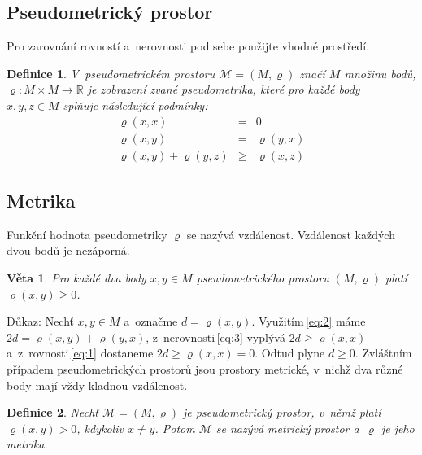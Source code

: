 \documentclass[twocolumn, a4paper, 11pt]{article}
\newtheorem{vet}{Věta}
\newtheorem{defn}{Definice}
\begin{document}
\subsection{Pseudometrický prostor} \label{pseudometric}
Pro zarovnání rovností a~nerovnosti pod sebe použijte vhodné prostředí.
\begin{defn} \label{defn1}
V~pseudometrickém prostoru ${\mathcal{M} = (M, \varrho)}$ značí $M$ množinu bodů,
${\varrho : M \times M \rightarrow \mathbb{R}}$ je zobrazení zvané \emph{pseudometrika}, které pro každé body ${x,y,z \in M}$
splňuje následující podmínky:
\setcounter{equation}{0}
\begin{eqnarray}
    \varrho(x, x) & = & 0 \label{eq:1} \\
    \varrho(x, y) & = & \varrho(y, x) \label{eq:2} \\
    \varrho(x, y) + \varrho(y, z) & \geq & \varrho(x, z) \label{eq:3}
\end{eqnarray}
\end{defn}
\subsection{Metrika} \label{metric}
Funkční hodnota pseudometriky $\varrho$ se nazývá vzdálenost.
Vzdálenost každých dvou bodů je nezáporná.
\begin{vet} \label{veta1}
Pro každé dva body ${x,y \in M}$ pseudometrického prostoru ${(M, \varrho)}$ platí ${\varrho(x,y) \geq 0}$.
\end{vet}
Důkaz: Nechť $x,y \in M$ a~označme $d = \varrho(x,y)$. Využitím\,\eqref{eq:2} máme $2d = \varrho(x, y) + \varrho(y, x)$, z~nerovnosti\,\eqref{eq:3} vyplývá $2d \geq \varrho(x, x)$ a~z~rovnosti\,\eqref{eq:1} dostaneme $2d \geq \varrho(x, x) = 0$. Odtud plyne $d \geq 0$.
Zvláštním případem pseudometrických prostorů jsou prostory metrické, v~nichž dva různé body mají vždy kladnou vzdálenost.
\begin{defn} \label{defn2}
Nechť $\mathcal{M} = (M, \varrho)$ je pseudometrický prostor, v~němž platí $\varrho(x, y) > 0$, kdykoliv $x\ne y$. Potom $\mathcal{M}$ se nazývá metrický prostor a~$\varrho$ je jeho \emph{metrika}.
\end{defn}
\end{document}
